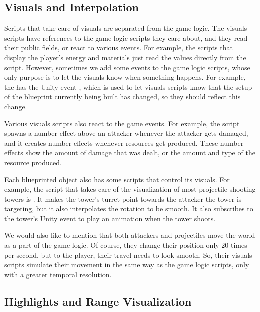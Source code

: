 \subsection{Visuals and Interpolation}

Scripts that take care of visuals are separated from the game logic.
The visuals scripts have references to the game logic scripts they care about, and they read their public fields, or react to various events.
For example, the scripts that display the player's energy and materials just read the values directly from the  script.
However, sometimes we add some events to the game logic scripts, whose only purpose is to let the visuals know when something happens.
For example, the  has the Unity event , which is used to let visuals scripts know that the setup of the blueprint currently being built has changed, so they should reflect this change.

Various visuals scripts also react to the game events.
For example, the  script spawns a number effect above an attacker whenever the attacker gets damaged, and it creates number effects whenever resources get produced.
These number effects show the amount of damage that was dealt, or the amount and type of the resource produced.

Each blueprinted object also has some scripts that control its visuals.
For example, the script that takes care of the visualization of most projectile-shooting towers is .
It makes the tower's turret point towards the attacker the tower is targeting, but it also interpolates the rotation to be smooth.
It also subscribes to the tower's  Unity event to play an animation when the tower shoots.

We would also like to mention that both attackers and projectiles move the world as a part of the game logic.
Of course, they change their position only 20 times per second, but to the player, their travel needs to look smooth.
So, their visuals scripts simulate their movement in the same way as the game logic scripts, only with a greater temporal resolution.

\subsection{Highlights and Range Visualization}\label{sec:docs-highlights}

